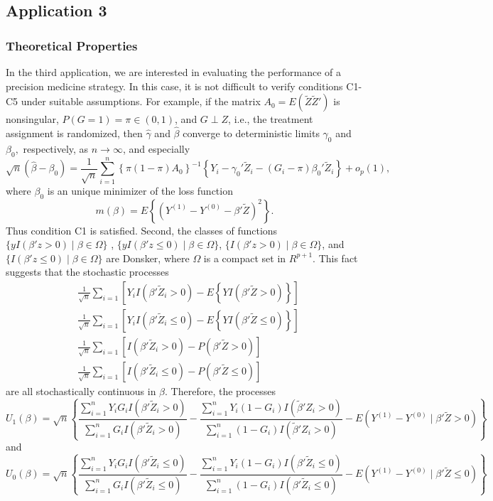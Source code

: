 \documentclass[12pt]{article}
\begin{document}
\subsection{Application 3}
\subsubsection{Theoretical Properties}
In  the third application, we are interested in evaluating the performance of a precision medicine strategy. In this case, it is not difficult to verify conditions C1-C5 under suitable assumptions. For example, if the matrix $A_0=E(\tilde{Z}\tilde{Z}')$ is nonsingular, $P(G=1)=\pi\in (0, 1)$, and $G\perp Z$, i.e., the treatment assignment is randomized,  then $\hat{\gamma}$ and $\hat{\beta}$ converge to deterministic limits $\gamma_0$ and $\beta_0,$ respectively, as $n \rightarrow \infty$, and especially
$$ \sqrt{n}(\hat{\beta}-\beta_0)=\frac{1}{\sqrt{n}}\sum_{i=1}^n \left\{\pi(1-\pi)A_0\right\}^{-1}\left\{Y_i-\gamma_0'\tilde{Z}_i-(G_i-\pi)\beta_0'\tilde{Z}_i\right\}+o_p(1),$$
where $\beta_0$ is an unique minimizer of the loss function
$$ m(\beta)=E\left\{\left(Y^{(1)}-Y^{(0)}-\beta'\tilde{Z}\right)^2\right\}.$$
Thus condition C1 is satisfied.  Second,  the classes of functions $\{yI(\beta'z>0) \mid \beta \in \Omega\}$ , $\{yI(\beta'z\le 0) \mid \beta \in \Omega\}$, $\{I(\beta'z>0)\mid \beta\in \Omega\}$, and $\{I(\beta'z\le 0)\mid \beta\in \Omega\}$ are Donsker, where $\Omega$ is a compact set in $R^{p+1}$.  This fact suggests that the stochastic processes
\begin{align*}
&\frac{1}{\sqrt{n}}\sum_{i=1} \left[Y_iI(\beta'\tilde{Z}_i>0)-E\left\{YI(\beta'\tilde{Z}>0)\right\} \right]\\
&\frac{1}{\sqrt{n}}\sum_{i=1} \left[Y_iI(\beta'\tilde{Z}_i\le 0)-E\left\{YI(\beta'\tilde{Z}\le 0)\right\} \right]\\
&\frac{1}{\sqrt{n}}\sum_{i=1} \left[I(\beta'\tilde{Z}_i>0)-P(\beta'\tilde{Z}>0) \right]\\
&\frac{1}{\sqrt{n}}\sum_{i=1} \left[I(\beta'\tilde{Z}_i\le 0)-P(\beta'\tilde{Z}\le 0) \right]
\end{align*}
are all stochastically continuous in $\beta.$ Therefore, the processes
$$U_1(\beta)=\sqrt{n}\left\{\frac{\sum_{i=1}^n Y_iG_iI(\beta'\tilde{Z}_i>0)}{\sum_{i=1}^n G_i I(\beta'\tilde{Z}_i>0)}-\frac{\sum_{i=1}^n Y_i(1-G_i)I(\tilde{\beta}'Z_i>0)}{\sum_{i=1}^n (1-G_i)I(\tilde{\beta}'Z_i>0)}-E\left(Y^{(1)}-Y^{(0)} \mid \beta'\tilde{Z}>0 \right)\right\}$$
and 
$$
U_0(\beta)=\sqrt{n}\left\{\frac{\sum_{i=1}^n Y_iG_iI(\beta'\tilde{Z}_i\le 0)}{\sum_{i=1}^n G_i I(\beta'\tilde{Z}_i\le 0)}-\frac{\sum_{i=1}^n Y_i(1-G_i)I(\beta'\tilde{Z}_i\le 0)}{\sum_{i=1}^n (1-G_i)I(\beta'\tilde{Z}_i\le 0)}-E\left(Y^{(1)}-Y^{(0)} \mid \beta'\tilde{Z}\le 0 \right)\right\}$$
\end{document}
